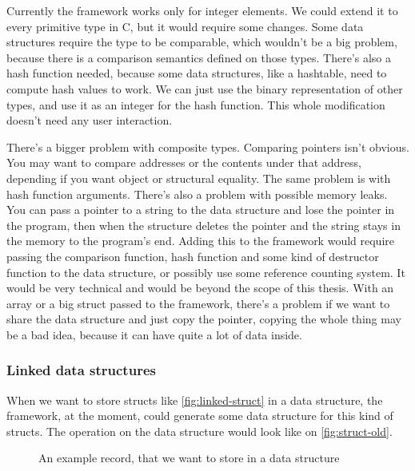 \documentclass[a4paper,11pt]{article}
\begin{document}
		Currently the framework works only for integer elements. We could extend it to every primitive type in
		C, but it would require some changes.  Some data structures require the type to be comparable, which
		wouldn't be a big problem, because there is a comparison semantics defined on those types. There's also
		a hash function needed, because some data structures, like a hashtable, need to compute hash values to
		work. We can just use the binary representation of other types, and use it as an integer for the hash
		function. This whole modification doesn't need any user interaction.

		There's a bigger problem with composite types. Comparing pointers isn't obvious. You may want to compare
		addresses or the contents under that address, depending if you want object or structural equality. The
		same problem is with hash function arguments. There's also a problem with possible memory leaks. You can
		pass a pointer to a string to the data structure and lose the pointer in the program, then when the
		structure deletes the pointer and the string stays in the memory to the program's end. Adding this to
		the framework would require passing the comparison function, hash function and some kind of destructor
		function to the data structure, or possibly use some reference counting system. It would be very
		technical and would be beyond the scope of this thesis. With an array or a big struct passed to the
		framework, there's a problem if we want to share the data structure and just copy the pointer, copying
		the whole thing may be a bad idea, because it can have quite a lot of data inside.

		\subsubsection{Linked data structures}

			When we want to store structs like \autoref{fig:linked-struct} in a data structure, the
			framework, at the moment, could generate some data structure for this kind of structs. The
			operation on the data structure would look like on \autoref{fig:struct-old}.

			\begin{figure}
				

				\caption{An example record, that we want to store in a data structure}

				\label{fig:linked-struct}
			\end{figure}
\end{document}
